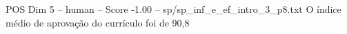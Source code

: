 \begin{textsample}{POS Dim 5 – human – Score -1.00 – sp/sp\_inf\_e\_ef\_intro\_3\_p8.txt}  \label{ex:f5_pos_015}
O índice médio de aprovação do currículo foi de 90,8 %

\end{textsample}
